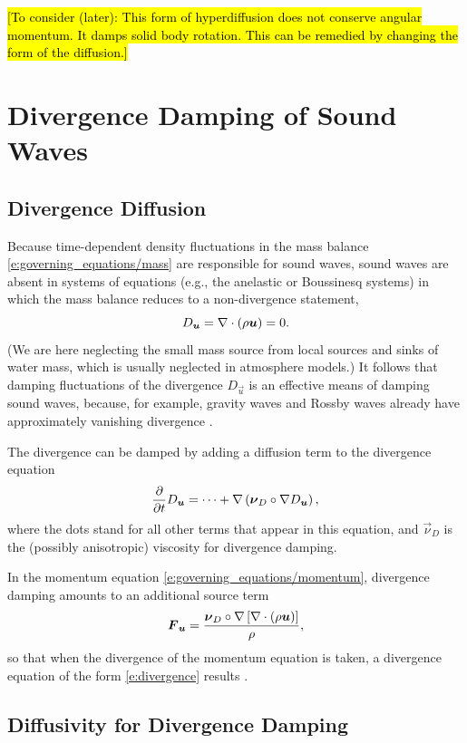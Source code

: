 \documentclass{report}
\begin{document}
\hl{[To consider (later): This form of hyperdiffusion does not conserve angular momentum. It damps solid body rotation. This can be remedied by changing the form of the diffusion.]}

\section{Divergence Damping of Sound Waves}

\subsection{Divergence Diffusion}

Because time-dependent density fluctuations in the mass balance \eqref{e:governing_equations/mass} are responsible for sound waves, sound waves are absent in systems of equations (e.g., the anelastic or Boussinesq systems) in which the mass balance reduces to a non-divergence statement,
\[
D_{\boldsymbol{{u}}} = \nabla \cdot (\rho \boldsymbol{{u}}) = 0.
\]
(We are here neglecting the small mass source from local sources and sinks of water mass, which is usually neglected in atmosphere models.) It follows that damping fluctuations of the divergence $D_{\vec{u}}$ is an effective means of damping sound waves, because, for example, gravity waves and Rossby waves already have approximately vanishing divergence \citep{Skamarock92a}. 

The divergence can be damped by adding a diffusion term to the divergence equation
\begin{equation}\label{e:divergence}
\frac{\partial}{\partial t} D_{\boldsymbol{{u}}}  = \cdots + \nabla \left( \boldsymbol{{\nu}}_D \circ \nabla D_{\boldsymbol{{u}}} \right),
\end{equation}
where the dots stand for all other terms that appear in this equation, and $\vec{\nu}_D$ is the (possibly anisotropic) viscosity for divergence damping.

In the momentum equation \eqref{e:governing_equations/momentum}, divergence damping amounts to an additional source term
\begin{equation}
\boldsymbol{{F}}_{\boldsymbol{{u}}} = \frac{\boldsymbol{{\nu}}_D \circ \nabla\left[\nabla \cdot (\rho \boldsymbol{{u}}) \right]}{\rho},
\end{equation}
so that when the divergence of the momentum equation is taken, a divergence equation of the form \eqref{e:divergence} results \citep[cf.][]{Jablonowski11a}. 

\subsection{Diffusivity for Divergence Damping}
\end{document}
